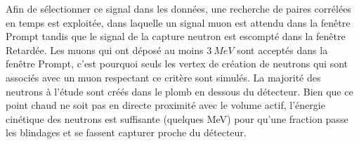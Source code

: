 
Afin de sélectionner ce signal dans les données, une recherche de paires corrélées en temps est exploitée, dans laquelle un signal muon est attendu dans la fenêtre Prompt tandis que le signal de la capture neutron est escompté dans la fenêtre Retardée. Les muons qui ont déposé au moins $\SI{3}{MeV}$ sont acceptés dans la fenêtre Prompt, c'est pourquoi seuls les vertex de création de neutrons qui sont associés avec un muon respectant ce critère sont simulés. La majorité des neutrons à l'étude sont créés dans le plomb en dessous du détecteur. Bien que ce point chaud ne soit pas en directe proximité avec le volume actif, l'énergie cinétique des neutrons est suffisante (quelques MeV) pour qu'une fraction passe les blindages et se fassent capturer proche du détecteur.\\

